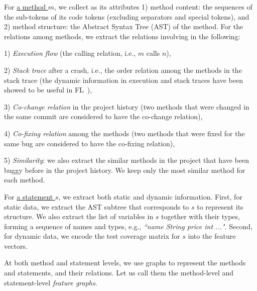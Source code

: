 For \underline{a method $m$}, we collect as its attributes 1) method
content: the sequences of the sub-tokens of its code tokens (excluding
separators and special tokens), and 2) method structure: the Abstract
Syntax Tree (AST) of the method. For the relations among methods, we
extract the relations involving in the following:

1) {\em Execution flow} (the calling relation, i.e., $m$ calls $n$),

2) {\em Stack trace} after a crash, i.e., the order relation among the
methods in the stack trace (the dynamic information in execution
and stack traces have been showed to be useful in
FL~\cite{icse21-fl,DeepFL}),

3) {\em Co-change relation} in the project history (two methods that
were changed in the same commit are considered to have the co-change
relation),

4) {\em Co-fixing relation} among the methods (two methods that were
fixed for the same bug are considered to have the co-fixing relation),

5) {\em Similarity}: we also extract the similar methods in the
project that have been buggy before in the project history.
We keep only the most similar method for each method.


For \underline{a statement $s$}, we extract both static and dynamic
information. First, for static data, we extract the AST subtree that
corresponds to $s$ to represent its structure. We also extract the
list of variables in $s$ together with their types, forming a sequence
of names and types, e.g., {\em ``name String price int ..."}.  Second,
for dynamic data, we encode the test coverage matrix for $s$ into the
feature vectors.
%

At both method and statement levels, we use graphs to represent
the methods and statements, and their relations. Let us call
them the method-level and statement-level {\em feature graphs}.




